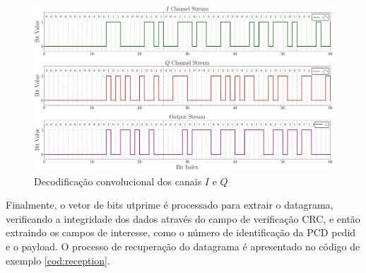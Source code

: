 \begin{figure}[H]
	\centering
	\caption{Decodificação convolucional dos canais $I$ e $Q$}\label{fig:receiver_conv}
	\includegraphics[width=\linewidth]{assets/cap3/receiver_conv_time.pdf}
\end{figure}

Finalmente, o vetor de bits \gls{utprime} é processado para extrair o datagrama, verificando a integridade dos dados através do campo de verificação \gls{CRC}, e então extraindo os campos de interesse, como o número de identificação da PCD \gls{pcdid} e o payload. O processo de recuperação do datagrama é apresentado no código de exemplo \ref{cod:reception}.


